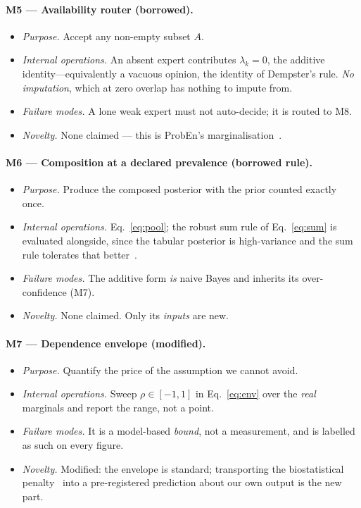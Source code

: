 \documentclass[sigplan,nonacm,screen]{acmart}
\begin{document}
\paragraph{M5 --- Availability router (borrowed).}
\begin{itemize}
  \item \emph{Purpose.} Accept any non-empty subset $A$.
  \item \emph{Internal operations.} An absent expert contributes $\lambda_k=0$, the additive identity---equivalently a vacuous opinion, the identity of Dempster's rule. \emph{No imputation}, which at zero overlap has nothing to impute from.
  \item \emph{Failure modes.} A lone weak expert must not auto-decide; it is routed to M8.
  \item \emph{Novelty.} None claimed --- this is ProbEn's marginalisation~\cite{chen2022proben}.
\end{itemize}

\paragraph{M6 --- Composition at a declared prevalence (borrowed rule).}
\begin{itemize}
  \item \emph{Purpose.} Produce the composed posterior with the prior counted exactly once.
  \item \emph{Internal operations.} Eq.~\eqref{eq:pool}; the robust sum rule of Eq.~\eqref{eq:sum} is evaluated alongside, since the tabular posterior is high-variance and the sum rule tolerates that better~\cite{kittler1998combining}.
  \item \emph{Failure modes.} The additive form \emph{is} naive Bayes and inherits its over-confidence (M7).
  \item \emph{Novelty.} None claimed. Only its \emph{inputs} are new.
\end{itemize}

\paragraph{M7 --- Dependence envelope (modified).}
\begin{itemize}
  \item \emph{Purpose.} Quantify the price of the assumption we cannot avoid.
  \item \emph{Internal operations.} Sweep $\rho\in[-1,1]$ in Eq.~\eqref{eq:env} over the \emph{real} marginals and report the range, not a point.
  \item \emph{Failure modes.} It is a model-based \emph{bound}, not a measurement, and is labelled as such on every figure.
  \item \emph{Novelty.} Modified: the envelope is standard; transporting the biostatistical penalty~\cite{grill2017comparison} into a pre-registered prediction about our own output is the new part.
\end{itemize}
\end{document}
